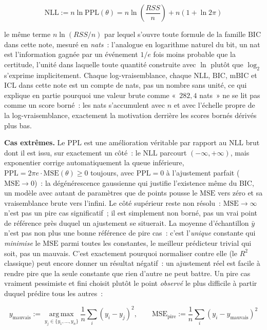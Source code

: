 \documentclass[11pt]{article}
\begin{document}
\begin{equation}
\mathrm{NLL} := n \ln \mathrm{PPL}(\theta) = n \ln\!\left(\frac{RSS}{n}\right) + n(1 + \ln 2\pi)
\end{equation}

le même terme $n\ln(RSS/n)$ par lequel s'ouvre toute formule de la
famille $\mathrm{BIC}$ dans cette note, mesuré en \emph{nats}~: l'analogue
en logarithme naturel du bit, un nat est l'information gagnée par un
événement $1/e$ fois moins probable que la certitude, l'unité dans
laquelle toute quantité construite avec $\ln$ plutôt que $\log_2$
s'exprime implicitement. Chaque log-vraisemblance, chaque
$\mathrm{NLL}$, $\mathrm{BIC}$, $\mathrm{mBIC}$ et $\mathrm{ICL}$ dans
cette note est un compte de nats, pas un nombre sans unité, ce qui
explique en partie pourquoi une valeur brute comme «~$282,4$ nats~» ne se
lit pas comme un score borné~: les nats s'accumulent avec $n$ et avec
l'échelle propre de la log-vraisemblance, exactement la motivation
derrière les scores bornés dérivés plus bas.

\textbf{Cas extrêmes.} Le $\mathrm{PPL}$ est une
amélioration véritable par rapport au $\mathrm{NLL}$ brut dont il est
issu, sur exactement un côté~: le $\mathrm{NLL}$ parcourt $(-\infty,
+\infty)$, mais exponentier corrige automatiquement la queue inférieure,
$\mathrm{PPL} = 2\pi e \cdot \mathrm{MSE}(\theta) \ge 0$ toujours, avec
$\mathrm{PPL} = 0$ à l'ajustement parfait ($\mathrm{MSE} \to 0$)~: la
dégénérescence gaussienne qui justifie l'existence même du BIC, un modèle
avec autant de paramètres que de points pousse le $\mathrm{MSE}$ vers zéro
et sa vraisemblance brute vers l'infini. Le côté supérieur reste non
résolu~: $\mathrm{MSE} \to \infty$ n'est pas un pire cas significatif~; il
est simplement non borné, pas un vrai point de référence près duquel un
ajustement se situerait. La moyenne
d'échantillon $\bar y$ n'est pas non plus une bonne référence de pire
cas~: c'est l'\emph{unique} constante qui \emph{minimise} le
$\mathrm{MSE}$ parmi toutes les constantes, le meilleur prédicteur
trivial qui soit, pas un mauvais. C'est exactement pourquoi normaliser
contre elle (le $R^2$ classique) peut encore donner un résultat négatif~:
un ajustement réel est facile à rendre pire que la seule constante que
rien d'autre ne peut battre. Un pire cas vraiment pessimiste et fini
choisit plutôt le point \emph{observé} le plus difficile à partir duquel
prédire tous les autres~:

\begin{equation}
y_{\text{mauvais}} := \operatorname*{arg\,max}_{y_j \in \{y_1,\dots,y_n\}}
\frac{1}{n}\sum_i (y_i - y_j)^2, \qquad
\mathrm{MSE}_{\text{pire}} := \frac{1}{n}\sum_i (y_i - y_{\text{mauvais}})^2
\end{equation}
\end{document}
